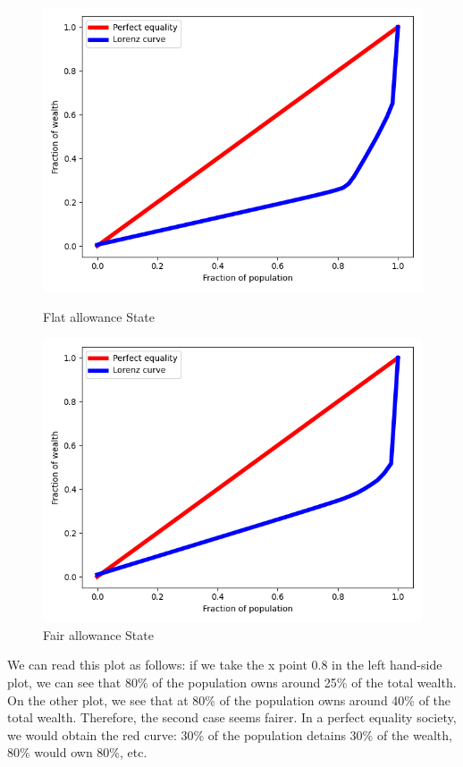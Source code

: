 {{{{{{{{{{{{{    \begin{figure}[H]
            \includegraphics[width=\linewidth]{img/exp/14_1.png}
            \caption{Flat allowance State}
        \endminipage\hfill
            \includegraphics[width=\linewidth]{img/exp/14_2.png}
            \caption{Fair allowance State}
        \endminipage\hfill
    \end{figure}

    We can read this plot as follows: if we take the x point 0.8 in the left hand-side plot, we can see that 80\% of the population owns around 25\% of the total wealth. On the other plot, we see that at 80\% of the population owns around 40\% of the total wealth. Therefore, the second case seems fairer. In a perfect equality society, we would obtain the red curve: 30\% of the population detains 30\% of the wealth, 80\% would own 80\%, etc. 
    
}}}}}}}}}}}}}
